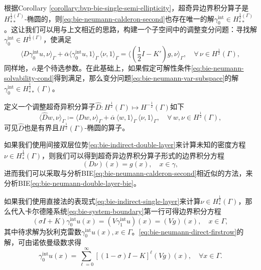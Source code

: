 根据Corollary \ref{corollary:bvp-bie-single-semi-ellipticity}，超奇异边界积分算子是$H_{**}^{\frac{1}{2}(\Gamma)}$-椭圆的，则\eqref{eq:bie-neumann-calderon-second}也存在唯一的解$\gamma_{0}^{\text{int}} \in H_{**}^{\frac{1}{2}(\Gamma)}$。这让我们可以用与上文相近的思路，构建一个子空间中的调整变分问题：寻找解$\gamma_{0}^{\text{int}} \in H^{\frac{1}{2}(\Gamma)}$，使满足
\begin{equation}
  \label{eq:bie-neumann-var-subspace}
  \langle D \gamma_{0}^{\text{int}} u, \nu \rangle_{\Gamma}
  + \overline{\alpha} \langle \gamma_{0}^{\text{int}} u, 1 \rangle_{\Gamma} \,
  \langle \nu, 1 \rangle_{\Gamma}
   =
  \langle \left( \frac{1}{2} I - K' \right) g, \nu \rangle_{\Gamma}, \quad \forall \, \nu \in H^{\frac{1}{2}}(\Gamma),
\end{equation}
同样地，$\overline{\alpha}$是个待选参数。在此基础上，如果假定可解性条件\eqref{eq:bie-neumann-solvability-cond}得到满足，那么变分问题\eqref{eq:bie-neumann-var-subspace}的解$\gamma_{0}^{\text{int}} \in H_{**}^{\frac{1}{2}}(\Gamma)$。

定义一个调整超奇异积分算子$\hat{D}:H^{\frac{1}{2}}(\Gamma) \mapsto H^{-\frac{1}{2}}(\Gamma)$如下
\begin{equation}
  \label{eq:bie-neumann-hatd}
  \langle \hat{D} w, \nu \rangle_{\Gamma}
  \coloneqq \langle Dw, \nu \rangle_{\Gamma}
  + \overline{\alpha} \, \langle w, 1 \rangle_{\Gamma} \,
  \langle \nu, 1 \rangle_{\Gamma}, \quad \forall \, w, \nu \in H^{\frac{1}{2}}(\Gamma),
\end{equation}
可见$\hat{D}$也是有界且$H^{\frac{1}{2}}(\Gamma)$-椭圆的算子。

如果我们使用间接双层位势\eqref{eq:bie-indirect-double-layer}来计算未知的密度方程$\nu \in H_{*}^{\frac{1}{2}}(\Gamma)$，则我们可以得到超奇异边界积分算子形式的边界积分方程
\begin{equation}
  \label{eq:bie-neumann-double-layer-bie}
  \left( D \nu \right)(x) = g(x), \quad x \in \gamma,
\end{equation}
进而我们可以采取与分析BIE\eqref{eq:bie-neumann-calderon-second}相近似的方法，来分析BIE\eqref{eq:bie-neumann-double-layer-bie}。

如果我们使用直接法的表现式\eqref{eq:bie-indirect-single-layer}来计算$\nu \in H_{*}^{\frac{1}{2}}(\Gamma)$，那么代入卡尔德隆系统\eqref{eq:bie-system-boundary}第一行可得边界积分方程
\begin{equation}
  \label{eq:bie-neumann-direct-firstrow}
  \left( \sigma I + K \right) \gamma_{0}^{\text{int}} u(x)
  = \left( V \gamma_{1}^{\text{int}} u \right)(x)
  = \left( V g \right)(x), \quad x \in \Gamma,
\end{equation}
其中待求解为狄利克雷数$\gamma_{0}^{\text{int}} u (x), x \in \Gamma$。\eqref{eq:bie-neumann-direct-firstrow}的解，可由诺依曼级数求得
\begin{equation}
  \label{eq:bie-neumann-direct-firstrow-neumann-seires}
  \gamma_{0}^{\text{int}} u(x) =
  \sum_{\ell = 0}^{\infty}
  \left[
  \left(  1- \sigma \right) I - K
  \right]^{\ell}
  \left( V g \right) (x), \quad \forall x \in \Gamma.
\end{equation}

